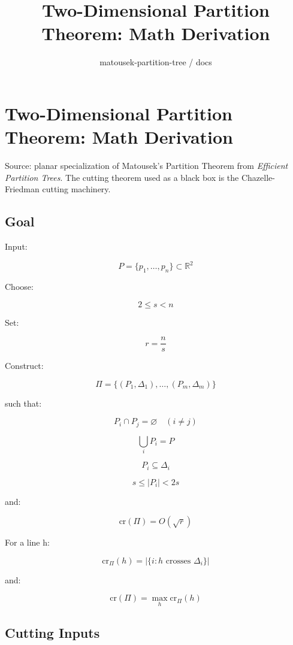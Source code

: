 \documentclass[
  11pt,
]{article}
\title{Two-Dimensional Partition Theorem: Math Derivation}
\subtitle{matousek-partition-tree / docs}
\author{}
\date{}
\begin{document}
\maketitle

{
\hypersetup{linkcolor=}
\setcounter{tocdepth}{3}
\tableofcontents
}
\hypertarget{two-dimensional-partition-theorem-math-derivation}{%
\section{Two-Dimensional Partition Theorem: Math
Derivation}\label{two-dimensional-partition-theorem-math-derivation}}

Source: planar specialization of Matousek's Partition Theorem from
\emph{Efficient Partition Trees}. The cutting theorem used as a black
box is the Chazelle-Friedman cutting machinery.

\hypertarget{goal}{%
\subsection{Goal}\label{goal}}

Input:

\[
P=\lbrace p_1,\ldots,p_n \rbrace\subset\mathbb R^2
\]

Choose:

\[
2\le s< n
\]

Set:

\[
r=\frac ns
\]

Construct:

\[
\Pi=\lbrace (P_1,\Delta_1),\ldots,(P_m,\Delta_m) \rbrace
\]

such that:

\[
P_i\cap P_j=\varnothing\quad(i\ne j)
\]

\[
\bigcup_iP_i=P
\]

\[
P_i\subseteq\Delta_i
\]

\[
s\le |P_i|<2s
\]

and:

\[
\mathrm{cr}(\Pi)=O(\sqrt r)
\]

For a line h:

\[
\mathrm{cr}_\Pi(h) = |\lbrace i:h\text{ crosses }\Delta_i \rbrace|
\]

and:

\[
\mathrm{cr}(\Pi)=\max_h\mathrm{cr}_\Pi(h)
\]

\hypertarget{cutting-inputs}{%
\subsection{Cutting Inputs}\label{cutting-inputs}}
\end{document}
